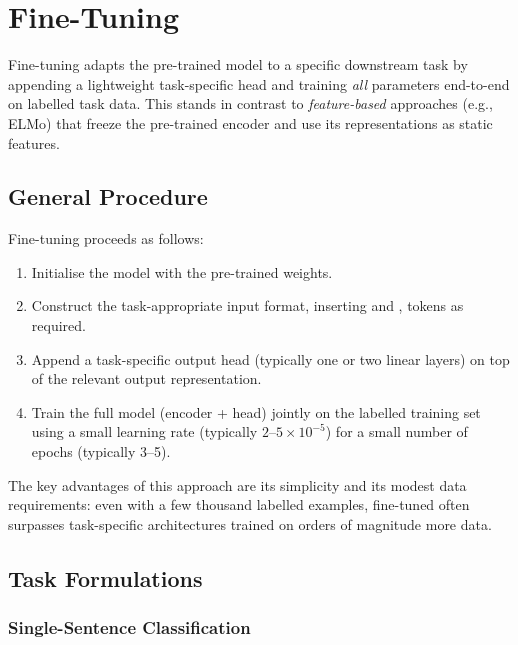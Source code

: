 
\section{Fine-Tuning}
\label{sec:finetuning}

Fine-tuning adapts the pre-trained \bert{} model to a specific downstream task by
appending a lightweight task-specific head and training \emph{all} parameters
end-to-end on labelled task data.  This stands in contrast to \emph{feature-based}
approaches (e.g., ELMo) that freeze the pre-trained encoder and use its
representations as static features.

\subsection{General Procedure}
\label{subsec:ft_procedure}

Fine-tuning proceeds as follows:
\begin{enumerate}
  \item Initialise the model with the pre-trained \bert{} weights.
  \item Construct the task-appropriate input format, inserting \cls{} and \sep{}
        tokens as required.
  \item Append a task-specific output head (typically one or two linear layers)
        on top of the relevant \bert{} output representation.
  \item Train the full model (encoder + head) jointly on the labelled training set
        using a small learning rate (typically $2\text{--}5 \times 10^{-5}$) for a
        small number of epochs (typically 3--5).
\end{enumerate}

The key advantages of this approach are its simplicity and its modest data
requirements: even with a few thousand labelled examples, fine-tuned \bert{} often
surpasses task-specific architectures trained on orders of magnitude more data.

\subsection{Task Formulations}
\label{subsec:ft_tasks}

\subsubsection{Single-Sentence Classification}
\label{ssubsec:cls}

